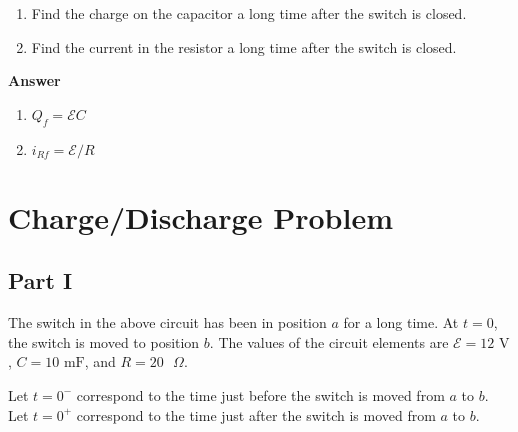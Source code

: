 \documentclass{article}
\begin{document}


\begin{enumerate}

  \item Find the charge on the capacitor a long time after the switch is closed.

  \item Find the current in the resistor a long time after the switch is closed.

\end{enumerate}

\ifsolutions
\textbf{Answer}

    \begin{enumerate}

      \item $Q_f=\mathcal{E}C$

      \item $i_{Rf}=\mathcal{E}/R$

    \end{enumerate}
\else
\vskip 144pt
\fi
\ifsolutions\else
\vskip 144pt
\fi

\newpage

\section{Charge/Discharge Problem}

\subsection{Part I}



The switch in the above circuit has been in position $a$ for a long time. At $t = 0$, the switch is moved to position $b$. The values of the circuit elements are $\mathcal{E}= 12\text{ V}$, $C = 10\text{ mF}$, and $R = 20\text{ }\Omega$.

Let $t=0^-$ correspond to the time just before the switch is moved from $a$ to $b$. Let $t=0^+$ correspond to the time just after the switch is moved from $a$ to $b$.
\end{document}
